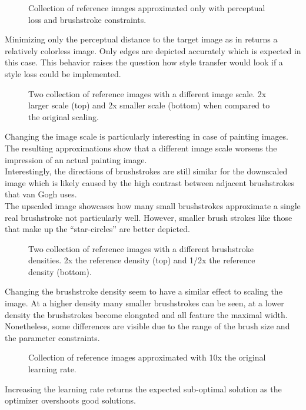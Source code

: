 \begin{figure*}
    \caption[]{Collection of reference images approximated only with perceptual loss and brushstroke constraints.}
\end{figure*}
Minimizing only the perceptual distance to the target image as in  returns a relatively colorless image.
Only edges are depicted accurately which is expected in this case.
This behavior raises the question how style transfer would look if a style loss could be implemented.

\begin{figure*}
    \caption[]{Two collection of reference images with a different image scale. 2x larger scale (top) and 2x smaller scale (bottom) when compared to the original scaling.}
\end{figure*}
Changing the image scale is particularly interesting in case of painting images.
The resulting approximations show that a different image scale worsens the impression of an actual painting image.\\
Interestingly, the directions of brushstrokes are still similar for the downscaled image which is likely caused by the high contrast between adjacent brushstrokes that van Gogh uses.\\
The upscaled image showcases how many small brushstrokes approximate a single real brushstroke not particularly well.
However, smaller brush strokes like those that make up the ``star-circles'' are better depicted.

\begin{figure*}
    \caption[]{Two collection of reference images with a different brushstroke densities. 2x the reference density (top) and 1/2x the reference density (bottom).}
\end{figure*}
Changing the brushstroke density seem to have a similar effect to scaling the image.
At a higher density many smaller brushstrokes can be seen, at a lower density the brushstrokes become elongated and all feature the maximal width.
Nonetheless, some differences are visible due to the range of the brush size and the parameter constraints.

\begin{figure*}
    \caption[]{Collection of reference images approximated with 10x the original learning rate.}
\end{figure*}
Increasing the learning rate returns the expected sub-optimal solution as the optimizer overshoots good solutions. 

